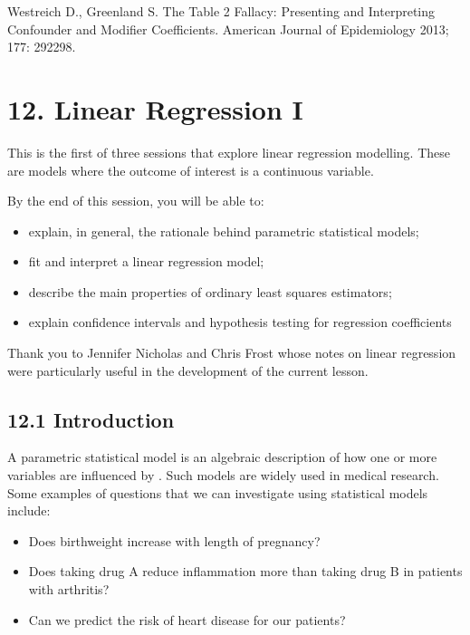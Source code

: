\documentclass[letterpaper,10pt,english]{jupyterBook}
\begin{document}
\sphinxAtStartPar
Westreich D., Greenland S. The Table 2 Fallacy: Presenting and Interpreting Confounder and Modifier Coefficients. American Journal of Epidemiology 2013; 177: 292\sphinxhyphen{}298.


\chapter{12. Linear Regression I}
\label{\detokenize{12.a. Linear Regression I:linear-regression-i}}\label{\detokenize{12.a. Linear Regression I::doc}}
\sphinxAtStartPar
This is the first of three sessions that explore linear regression modelling. These are models where the outcome of interest is a continuous variable.



\sphinxAtStartPar
By the end of this session, you will be able to:
\begin{itemize}
\item {} 
\sphinxAtStartPar
explain, in general, the rationale behind parametric statistical models;

\item {} 
\sphinxAtStartPar
fit and interpret a linear regression model;

\item {} 
\sphinxAtStartPar
describe the main properties of ordinary least squares estimators;

\item {} 
\sphinxAtStartPar
explain confidence intervals and hypothesis testing for regression coefficients

\end{itemize}



\sphinxAtStartPar
{}  Thank you to Jennifer Nicholas and Chris Frost whose notes on linear regression were particularly useful in the development of the current lesson.


\section{12.1 Introduction}
\label{\detokenize{12.b. Linear Regression I:introduction}}\label{\detokenize{12.b. Linear Regression I::doc}}
\sphinxAtStartPar
A parametric statistical model is an algebraic description of how one or more  variables are influenced by . Such models are widely used in medical research. Some examples of questions that we can investigate using statistical models include:
\begin{itemize}
\item {} 
\sphinxAtStartPar
Does birthweight increase with length of pregnancy?

\item {} 
\sphinxAtStartPar
Does taking drug A reduce inflammation more than taking drug B in patients with arthritis?

\item {} 
\sphinxAtStartPar
Can we predict the risk of heart disease for our patients?

\end{itemize}
\end{document}
